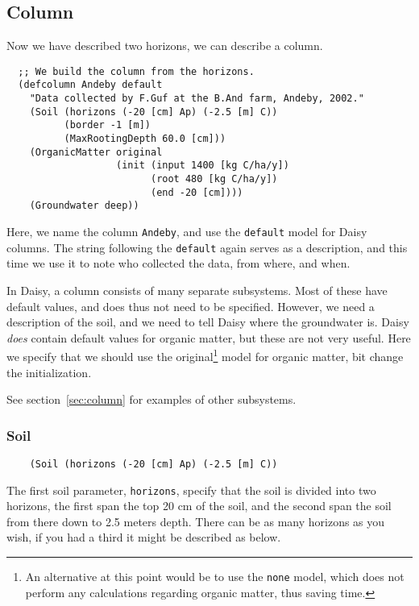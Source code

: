 \documentclass[a4paper]{article}
\begin{document}
\subsection{Column}
\label{ex:column}

Now we have described two horizons, we can describe a column.

\begin{verbatim}
  ;; We build the column from the horizons.
  (defcolumn Andeby default
    "Data collected by F.Guf at the B.And farm, Andeby, 2002."
    (Soil (horizons (-20 [cm] Ap) (-2.5 [m] C))
          (border -1 [m])
          (MaxRootingDepth 60.0 [cm]))
    (OrganicMatter original
                   (init (input 1400 [kg C/ha/y])
                         (root 480 [kg C/ha/y])
                         (end -20 [cm])))
    (Groundwater deep))
\end{verbatim}

Here, we name the column \texttt{Andeby}, and use the \texttt{default}
model for Daisy columns.  The string following the \texttt{default}
again serves as a description, and this time we use it to note who
collected the data, from where, and when.

In Daisy, a column consists of many separate subsystems.  Most of
these have default values, and does thus not need to be specified.
However, we need a description of the soil, and we need to tell
Daisy where the groundwater is.  Daisy \emph{does} contain default
values for organic matter, but these are not very useful.  Here we
specify that we should use the original\footnote{An alternative at
  this point would be to use the \texttt{none} model, which does not
  perform any calculations regarding organic matter, thus saving
  time.} model for organic matter, bit change the initialization.

See section~\ref{sec:column} for examples of other subsystems.

\subsubsection{Soil}
\label{ex:soil}

\begin{verbatim}
    (Soil (horizons (-20 [cm] Ap) (-2.5 [m] C))
\end{verbatim}
The first soil parameter, \texttt{horizons}, specify that the soil is
divided into two horizons, the first span the top 20 cm of the soil,
and the second span the soil from there down to 2.5 meters depth.
There can be as many horizons as you wish, if you had a third it might
be described as below.
\end{document}
